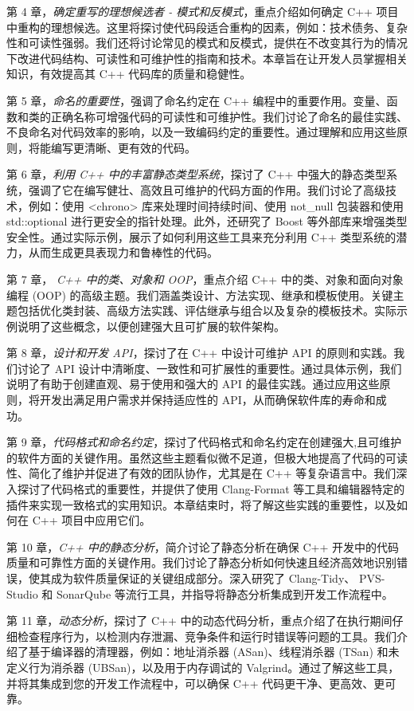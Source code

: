 第 4 章，\textit{确定重写的理想候选者 - 模式和反模式}，重点介绍如何确定 C++ 项目中重构的理想候选。这里将探讨使代码段适合重构的因素，例如：技术债务、复杂性和可读性强弱。我们还将讨论常见的模式和反模式，提供在不改变其行为的情况下改进代码结构、可读性和可维护性的指南和技术。本章旨在让开发人员掌握相关知识，有效提高其 C++ 代码库的质量和稳健性。

第 5 章，\textit{命名的重要性}，强调了命名约定在 C++ 编程中的重要作用。变量、函数和类的正确名称可增强代码的可读性和可维护性。我们讨论了命名的最佳实践、不良命名对代码效率的影响，以及一致编码约定的重要性。通过理解和应用这些原则，将能编写更清晰、更有效的代码。

第 6 章，\textit{利用 C++ 中的丰富静态类型系统}，探讨了 C++ 中强大的静态类型系统，强调了它在编写健壮、高效且可维护的代码方面的作用。我们讨论了高级技术，例如：使用 <chrono> 库来处理时间持续时间、使用 not\_null 包装器和使用 std::optional 进行更安全的指针处理。此外，还研究了 Boost 等外部库来增强类型安全性。通过实际示例，展示了如何利用这些工具来充分利用 C++ 类型系统的潜力，从而生成更具表现力和鲁棒性的代码。

第 7 章， \textit{C++ 中的类、对象和 OOP}，重点介绍 C++ 中的类、对象和面向对象编程 (OOP) 的高级主题。我们涵盖类设计、方法实现、继承和模板使用。关键主题包括优化类封装、高级方法实践、评估继承与组合以及复杂的模板技术。实际示例说明了这些概念，以便创建强大且可扩展的软件架构。

第 8 章，\textit{设计和开发 API}，探讨了在 C++ 中设计可维护 API 的原则和实践。我们讨论了 API 设计中清晰度、一致性和可扩展性的重要性。通过具体示例，我们说明了有助于创建直观、易于使用和强大的 API 的最佳实践。通过应用这些原则，将开发出满足用户需求并保持适应性的 API，从而确保软件库的寿命和成功。

第 9 章，\textit{代码格式和命名约定}，探讨了代码格式和命名约定在创建强大,且可维护的软件方面的关键作用。虽然这些主题看似微不足道，但极大地提高了代码的可读性、简化了维护并促进了有效的团队协作，尤其是在 C++ 等复杂语言中。我们深入探讨了代码格式的重要性，并提供了使用 Clang-Format 等工具和编辑器特定的插件来实现一致格式的实用知识。本章结束时，将了解这些实践的重要性，以及如何在 C++ 项目中应用它们。

第 10 章，\textit{C++ 中的静态分析}，简介讨论了静态分析在确保 C++ 开发中的代码质量和可靠性方面的关键作用。我们讨论了静态分析如何快速且经济高效地识别错误，使其成为软件质量保证的关键组成部分。深入研究了 Clang-Tidy、 PVS-Studio 和 SonarQube 等流行工具，并指导将静态分析集成到开发工作流程中。

第 11 章，\textit{动态分析}，探讨了 C++ 中的动态代码分析，重点介绍了在执行期间仔细检查程序行为，以检测内存泄漏、竞争条件和运行时错误等问题的工具。我们介绍了基于编译器的清理器，例如：地址消杀器 (ASan)、线程消杀器 (TSan) 和未定义行为消杀器 (UBSan)，以及用于内存调试的 Valgrind。通过了解这些工具，并将其集成到您的开发工作流程中，可以确保 C++ 代码更干净、更高效、更可靠。


